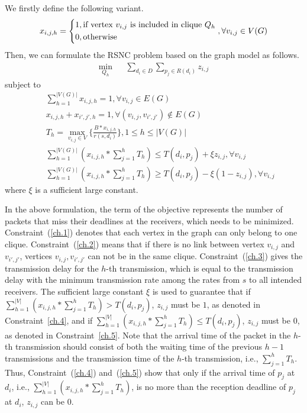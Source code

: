 \documentclass[journal]{IEEEtran}
\begin{document}
We firstly define the following variant.
{\small \begin{equation}
x_{i,j,h}=\left\{
\begin{aligned}
&1,\mbox{if vertex}~v_{i,j}~\mbox{is included in clique}~Q_h\\
&0,\mbox{otherwise}
\end{aligned}
\right.\\
,\forall v_{i,j}\in V(G)
\end{equation}}
Then, we can formulate the RSNC problem based on the graph model as follows.
{\small \begin{eqnarray}\label{formulation.obj}
\min_{Q_h} & &\sum_{d_i\in D}\sum_{p_j\in R(d_i)}z_{i,j}
\end{eqnarray}}
subject to{\small \begin{eqnarray}
&&\sum_{h=1}^{|V(G)|}x_{i,j,h}=1,\forall v_{i,j}\in E(G)\label{ch.1}\\
&&x_{i,j,h}+x_{i',j',h}=1,\forall (v_{i,j},v_{i',j'})\notin E(G)\label{ch.2}\\
&&T_h=\max_{v_{i,j}\in V}\{\frac{B*x_{i,j,h}}{r(s,d_i)}\},1\leq h\leq |V(G)|\label{ch.3}\\
&&\sum_{h=1}^{|V(G)|}(x_{i,j,h}*\sum_{j=1}^hT_h)\leq T(d_i,p_j)+\xi z_{i,j},\forall v_{i,j}\label{ch.4}\\
&&\sum_{h=1}^{|V(G)|}(x_{i,j,h}*\sum_{j=1}^hT_h)\geq T(d_i,p_j)-\xi (1-z_{i,j}),\forall v_{i,j}\label{ch.5}
\end{eqnarray}}\vspace{-0.04in}
where $\xi$ is a sufficient large constant.

In the above formulation, the term of the objective represents the number of packets that miss their deadlines at the receivers, which needs to be minimized.
Constraint~(\ref{ch.1}) denotes that each vertex in the graph can only belong to one clique. Constraint~(\ref{ch.2}) means that if there is no link between vertex $v_{i,j}$ and $v_{i',j'}$, vertices $v_{i,j},v_{i',j'}$ can not be in the same clique. Constraint~(\ref{ch.3}) gives the transmission delay for the $h$-th transmission, which is equal to the transmission delay with the minimum transmission rate among the rates from $s$ to all intended receivers. The sufficient large constant $\xi$ is used to guarantee that if $\sum_{h=1}^{|V|}(x_{i,j,h}*\sum_{j=1}^hT_h)>T(d_i,p_j)$, $z_{i,j}$ must be $1$, as denoted in Constraint~\ref{ch.4}, and if $\sum_{h=1}^{|V|}(x_{i,j,h}*\sum_{j=1}^hT_h)\leq T(d_i,p_j)$, $z_{i,j}$ must be $0$, as denoted in Constraint~\ref{ch.5}. Note that the arrival time of the packet in the $h$-th transmission should consist of both the waiting time of the previous $h-1$ transmissions and the transmission time of the $h$-th transmission, i.e., $\sum_{j=1}^h T_h$.
Thus, Constraint~(\ref{ch.4}) and~(\ref{ch.5}) show that only if the arrival time of $p_j$ at $d_i$, i.e., $\sum_{h=1}^{|V|}(x_{i,j,h}*\sum_{j=1}^hT_h)$, is no more than the reception deadline of $p_j$ at $d_i$, $z_{i,j}$ can be $0$.
\end{document}
